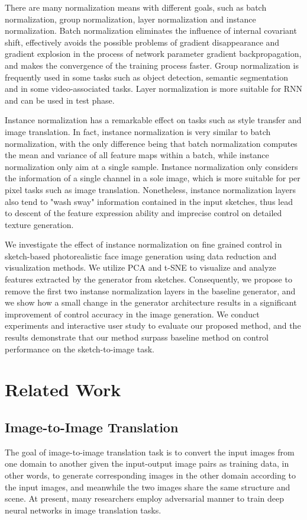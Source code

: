 \documentclass[10pt,twocolumn,letterpaper]{article}
\begin{document}
There are many normalization means with different goals, such as batch normalization\cite{bn}, group normalization\cite{gn}, layer normalization\cite{ln} and instance normalization\cite{instance_norm}. Batch normalization eliminates the influence of internal covariant shift, effectively avoids the possible problems of gradient disappearance and gradient explosion in the process of network parameter gradient backpropagation, and makes the convergence of the training process faster. Group normalization is frequently used in some tasks such as object detection, semantic segmentation and in some video-associated tasks. Layer normalization is more suitable for RNN and can be used in test phase.

Instance normalization\cite{instance_norm} has a remarkable effect on tasks such as style transfer and image translation\cite{pix2pixhd,spade,cyclegan}. In fact, instance normalization is very similar to batch normalization, with the only difference being that batch normalization computes the mean and variance of all feature maps within a batch, while instance normalization only aim at a single sample. Instance normalization only considers the information of a single channel in a sole image, which is more suitable for per pixel tasks such as image translation. Nonetheless, instance normalization layers also tend to "wash sway" information contained in the input sketches, thus lead to descent of the feature expression ability and imprecise control on detailed texture generation. 

We investigate the effect of instance normalization on fine grained control in sketch-based photorealistic face image generation using data reduction and visualization methods. We utilize PCA and t-SNE to visualize and analyze features extracted by the generator from sketches. Consequently, we propose to remove the first two instanse normalization layers in the baseline generator, and we show how a small change in the generator architecture results in a significant improvement of control accuracy in the image generation. We conduct experiments and interactive user study to evaluate our proposed method, and the results demonstrate that our method surpass baseline method on control performance on the sketch-to-image task.

\section{Related Work}
\subsection{Image-to-Image Translation}
The goal of image-to-image translation\cite{pix2pix} task is to convert the input images from one domain to another given the input-output image pairs as training data, in other words, to generate corresponding images in the other domain according to the input images, and meanwhile the two images share the same structure and scene. At present, many researchers employ adversarial manner to train deep neural networks in image translation tasks\cite{sis,cfgan,spade}.
\end{document}
